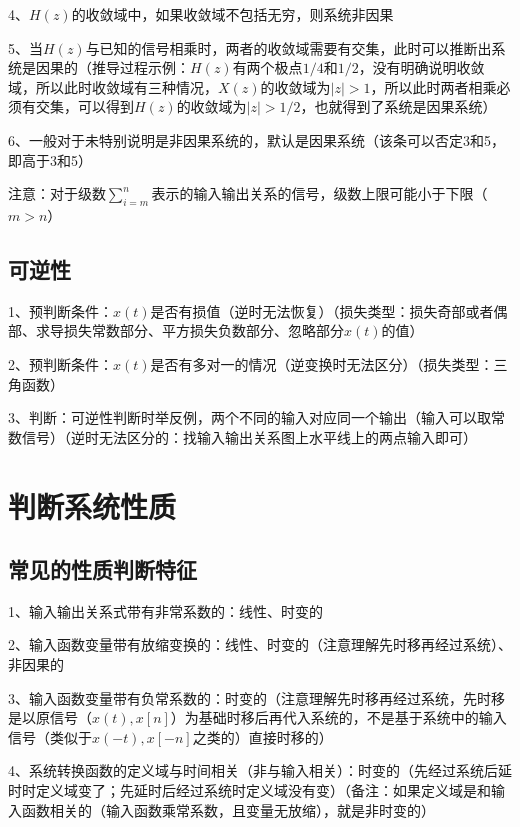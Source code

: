 4、$H(z)$的收敛域中，如果收敛域不包括无穷，则系统非因果

5、当$H(z)$与已知的信号相乘时，两者的收敛域需要有交集，此时可以推断出系统是因果的（推导过程示例：$H(z)$有两个极点$1/4$和$1/2$，没有明确说明收敛域，所以此时收敛域有三种情况，$X(z)$的收敛域为$|z| \gt 1$，所以此时两者相乘必须有交集，可以得到$H(z)$的收敛域为$|z| \gt 1/2$，也就得到了系统是因果系统）

6、一般对于未特别说明是非因果系统的，默认是因果系统（该条可以否定3和5，即高于3和5）

注意：对于级数$\sum_{i=m}^{n}$表示的输入输出关系的信号，级数上限可能小于下限（$m>n$）



\subsection{可逆性}

1、预判断条件：$x(t)$是否有损值（逆时无法恢复）（损失类型：损失奇部或者偶部、求导损失常数部分、平方损失负数部分、忽略部分$x(t)$的值）

2、预判断条件：$x(t)$是否有多对一的情况（逆变换时无法区分）（损失类型：三角函数）

3、判断：可逆性判断时举反例，两个不同的输入对应同一个输出（输入可以取常数信号）（逆时无法区分的：找输入输出关系图上水平线上的两点输入即可）

\section{判断系统性质}



\subsection{常见的性质判断特征}

1、输入输出关系式带有非常系数的：线性、时变的

2、输入函数变量带有放缩变换的：线性、时变的（注意理解先时移再经过系统）、非因果的

3、输入函数变量带有负常系数的：时变的（注意理解先时移再经过系统，先时移是以原信号（$x(t),x[n]$）为基础时移后再代入系统的，不是基于系统中的输入信号（类似于$x(-t),x[-n]$之类的）直接时移的）

4、系统转换函数的定义域与时间相关（非与输入相关）：时变的（先经过系统后延时时定义域变了；先延时后经过系统时定义域没有变）（备注：如果定义域是和输入函数相关的（输入函数乘常系数，且变量无放缩），就是非时变的）

